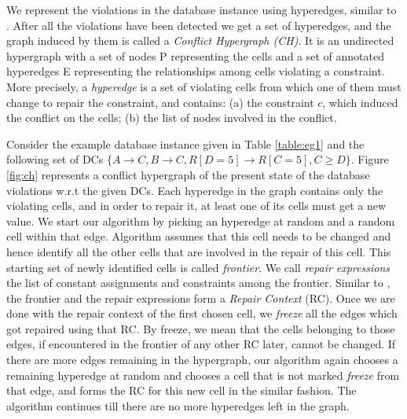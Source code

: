 We represent the violations in the database instance using hyperedges, similar to \cite{XuChu,Kolahi}.
After all the violations have been detected we get a set of hyperedges, and the graph induced by them is called a \textit{Conflict Hypergraph (CH)}.
It is an undirected hypergraph with a set of nodes P representing the cells and a set of annotated hyperedges E representing the relationships among cells violating a constraint.
More precisely, a \textit{hyperedge} is a set of violating cells from which one of them must change to repair the constraint, and contains: 
(a) the constraint $c$, which induced the conflict on the cells; (b) the list of nodes involved in the conflict.

Consider the example database instance given in Table \ref{table:eg1} and the following set of DCs $\{ A \rightarrow C, B \rightarrow C, R[D=5] \rightarrow R[C=5], C \geq D \}$.
Figure \ref{fig:ch} represents a conflict hypergraph of the present state of the database violations w.r.t the given DCs.
Each hyperedge in the graph contains only the violating cells, and in order to repair it, at least one of its cells must get a new value.
We start our algorithm by picking an hyperedge at random and a random cell within that edge.
Algorithm assumes that this cell needs to be changed and hence identify all the other cells that are involved in the repair of this cell.
This starting set of newly identified cells is called \textit{frontier}.
We call \textit{repair expressions} the list of constant assignments and constraints among the frontier.
Similar to \cite{XuChu}, the frontier and the repair expressions form a \textit{Repair Context} (RC).
Once we are done with the repair context of the first chosen cell, we \textit{freeze} all the edges which got repaired using that RC.
By freeze, we mean that the cells belonging to those edges, if encountered in the frontier of any other RC later, cannot be changed.
If there are more edges remaining in the hypergraph, our algorithm again chooses a remaining hyperedge at random and chooses a cell that is not marked \textit{freeze} from that edge,
and forms the RC for this new cell in the similar fashion.
The algorithm continues till there are no more hyperedges left in the graph.

